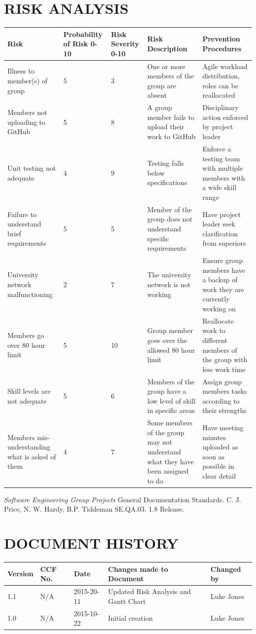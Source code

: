 \documentclass{project}
\begin{document}
\section{RISK ANALYSIS}
\begin{tabular}{ | p{3cm} | p{2cm} | p{2cm} | p{4cm} | p{4cm} |  }
  \hline
  \textbf{Risk} & \textbf{Probability of Risk 0-10} & \textbf{Risk Severity 0-10} & \textbf{Risk Description} & \textbf{Prevention Procedures} \\ \hline
Illness to member(s) of group & 5 & 3 & One or more members of the group are absent & Agile workload distribution, roles can be reallocated \\ \hline
Members not uploading to GitHub & 5 & 8 & A group member fails to upload their work to GitHub & Disciplinary action enforced by project leader \\ \hline
Unit testing not adequate & 4 & 9 & Testing falls below specifications & Enforce a testing team with multiple members with a wide skill range \\ \hline
Failure to understand brief requirements & 5 & 5 & Member of the group does not understand specific requirements & Have project leader seek clarification from superiors \\ \hline
University network malfunctioning & 2 & 7 & The university network is not working & Ensure group members have a backup of work they are currently working on \\ \hline
Members go over 80 hour limit & 5 & 10 & Group member goes over the allowed 80 hour limit & Reallocate work to different members of the group with less work time \\ \hline
Skill levels are not adequate & 5 & 6 & Members of the group have a low level of skill in specific areas
& Assign group members tasks according to their strengths \\ \hline
Members mis-understanding what is asked of them & 4 & 7 & Some members of the group may not understand what they have been assigned to do &  Have meeting minutes uploaded as soon as possible in clear detail\\
  \hline
\end{tabular}  
\begin{thebibliography}{5}
 \emph{Software Engineering Group Projects}
General Documentation Standards.
C. J. Price, N. W. Hardy, B.P. Tiddeman SE.QA.03. 1.8 Release.
\end{thebibliography}
\section*{DOCUMENT HISTORY}
\begin{tabular}{|l | l | l | l | l |}
\hline
Version & CCF No. & Date & Changes made to Document & Changed by \\
\hline
1.1 & N/A & 2015-20-11 & Updated Risk Analysis and Gantt Chart & Luke Jones\\
\hline
1.0 & N/A & 2015-10-22 & Initial creation & Luke Jones\\
\hline
\end{tabular}
\label{thelastpage}
\end{document}
